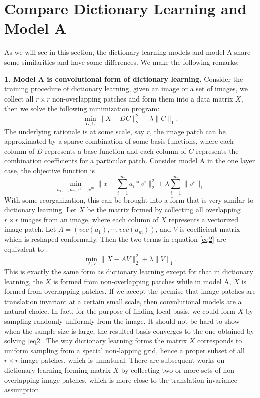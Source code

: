 \documentclass[a4paper]{article}
\begin{document}
\newpage
\section{Compare Dictionary Learning and Model A}
As we will see in this section, the dictionary learning models and model A share some similarities and have some differences. We make the following remarks: 

\textbf{1. Model A is convolutional form of dictionary learning.} Consider the training procedure of dictionary learning, given an image or a set of images, we collect all $r\times r$ non-overlapping patches and form them into a data matrix $X$, then we solve the following minimization program:
\begin{equation}
	\min_{D,C} \|X-DC\|_2^2 + \lambda\|C\|_1.
\end{equation}
The underlying rationale is at some scale, say $r$, the image patch can be approximated by a sparse combination of some basis functions, where each column of $D$ represents a base function and each column of $C$ represents the combination coefficients for a particular patch.
Consider model A in the one layer case, the objective function is 
\begin{equation}
\label{eq2}
	\min_{a_1,\cdots,a_m,v^{0}\cdots ,v^{m}} \|x-\sum_{i=1}^{m} a_i*v^{i}\|_2^2 +\lambda \sum_{i=1}^{m} \|v^{i}\|_1
\end{equation}
With some reorganization, this can be brought into a form that is very similar to dictionary learning. Let $X$ be the matrix formed by collecting all overlapping $r\times r$ images from an image, where each column of $X$ represents a vectorized image patch. Let $A=(vec(a_1),\cdots, vec(a_m))$, and $V$ is coefficient matrix which is reshaped conformally. Then the two terms in equation \eqref{eq2} are equivalent to :
\begin{equation}
	\min_{A,V} \|X-AV\|_2^2+\lambda \|V\|_1.
\end{equation}
This is exactly the same form as dictionary learning except for that in dictionary learning, the $X$ is formed from non-overlapping patches while in model A, $X$ is formed from overlapping patches. If we accept the premise that image patches are translation invariant at a certain small scale, then convolutional models are a natural choice. In fact, for the purpose of finding local basis, we could form $X$ by sampling randomly uniformly from the image. It should not be hard to show when the sample size is large, the resulted basis converges to the one obtained by solving \eqref{eq2}. The way dictionary learning forms the matrix $X$ corresponds to uniform sampling from a special non-lapping grid, hence a proper subset of all $r\times r$ image patches, which is unnatural. There are subsequent works on dictionary learning forming matrix $X$ by collecting two or more sets of non-overlapping image patches, which is more close to the translation invariance assumption.
\end{document}
